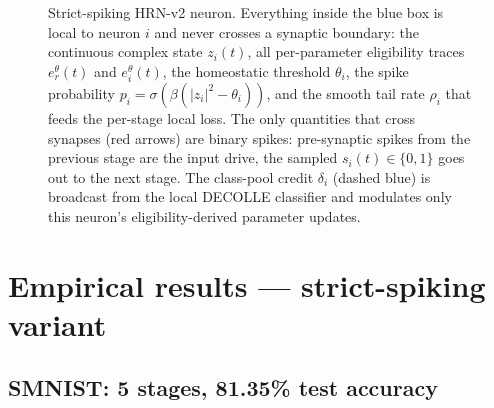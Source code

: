 \documentclass[11pt]{article}
\begin{document}
\begin{figure}[ht]
{%
}
\caption{Strict-spiking HRN-v2 neuron. Everything inside the blue
box is local to neuron $i$ and never crosses a synaptic boundary:
the continuous complex state $z_i(t)$, all per-parameter
eligibility traces $e^\theta_r(t)$ and $e^\theta_i(t)$, the
homeostatic threshold $\theta_i$, the spike probability
$p_i = \sigma(\beta(|z_i|^2 - \theta_i))$, and the smooth tail
rate $\rho_i$ that feeds the per-stage local loss. The only
quantities that cross synapses (red arrows) are binary spikes:
pre-synaptic spikes from the previous stage are the input drive,
the sampled $s_i(t) \in \{0, 1\}$ goes out to the next stage. The
class-pool credit $\delta_i$ (dashed blue) is broadcast from the
local DECOLLE classifier and modulates only this neuron's
eligibility-derived parameter updates.}
\label{fig:spiking-neuron}
\end{figure}

\section{Empirical results --- strict-spiking variant}\label{sec:spiking-results}

\subsection{SMNIST: 5 stages, 81.35\% test accuracy}
\end{document}
